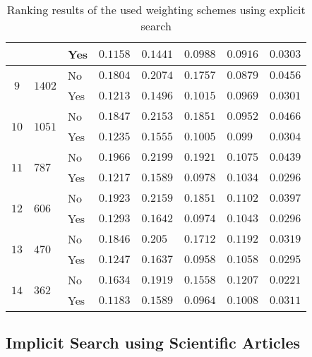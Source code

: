\begin{table}[b]
\begin{adjustwidth}{-2cm}{}
\begin{tabular}{ c C{1.5cm} C{2.1cm} C{2.1cm} C{2.1cm} C{2.1cm} C{2.1cm} C{2.1cm} }
                                                    && Yes & $0.1158$ & $0.1441$ & $0.0988$ & $0.0916$ & $0.0303$  \\ \midrule
       &  & No  & $0.1804$ & $0.2074$ & $0.1757$ & $0.0879$ & $0.0456$  \\
                                                    && Yes & $0.1213$ & $0.1496$ & $0.1015$ & $0.0969$ & $0.0301$  \\ \midrule
       &  & No & $0.1847$ & $0.2153$ & $0.1851$ & $0.0952$ & $0.0466$  \\
                                                    && Yes & $0.1235$ & $0.1555$ & $0.1005$ & $0.099$  & $0.0304$  \\ \midrule
       &  & No  & $0.1966$ & $0.2199$ & $0.1921$ & $0.1075$ & $0.0439$  \\
                                                    && Yes & $0.1217$ & $0.1589$ & $0.0978$ & $0.1034$ & $0.0296$  \\ \midrule
       &  & No  & $0.1923$ & $0.2159$ & $0.1851$ & $0.1102$ & $0.0397$  \\
                                                    && Yes & $0.1293$ & $0.1642$ & $0.0974$ & $0.1043$ & $0.0296$  \\ \midrule
       &  & No  & $0.1846$ & $0.205$ & $0.1712$ & $0.1192$ & $0.0319$   \\
                                                    && Yes & $0.1247$ & $0.1637$ & $0.0958$ & $0.1058$ & $0.0295$  \\ \midrule
       &  & No  & $0.1634$ & $0.1919$ & $0.1558$ & $0.1207$ & $0.0221$  \\
                                                    && Yes & $0.1183$ & $0.1589$ & $0.0964$ & $0.1008$ & $0.0311$  \\
      \bottomrule
    \end{tabular}
  \caption[Ranking results with explicit search]{Ranking results of the used weighting schemes using explicit search}
  \label{tbl:ranking_result_explicit}
  \end{adjustwidth}
\end{table}

\subsection{Implicit Search using Scientific Articles}

